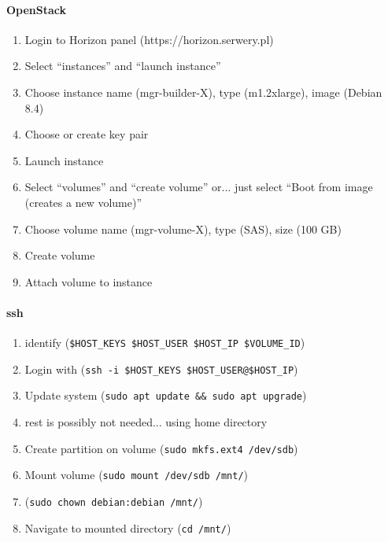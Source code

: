 \documentclass[printmode]{mgr}
\begin{document}






\paragraph{OpenStack}



\begin{enumerate}
  \item Login to Horizon panel (https://horizon.serwery.pl)
  \item Select ``instances'' and ``launch instance''
  \item Choose instance name (mgr-builder-X), type (m1.2xlarge), image (Debian 8.4)
  \item Choose or create key pair
  \item Launch instance
  \item Select ``volumes'' and ``create volume'' or... just select ``Boot from image (creates a new volume)'' 
  \item Choose volume name (mgr-volume-X), type (SAS), size (100 GB)
  \item Create volume
  \item Attach volume to instance
\end{enumerate}

\paragraph{ssh}

\begin{enumerate}
  \item identify (\verb|$HOST_KEYS $HOST_USER $HOST_IP $VOLUME_ID|)
  \item Login with (\verb|ssh -i $HOST_KEYS $HOST_USER@$HOST_IP|)
  \item Update system (\verb|sudo apt update && sudo apt upgrade|)
  \item rest is possibly not needed... using home directory
  \item Create partition on volume (\verb|sudo mkfs.ext4 /dev/sdb|)
  \item Mount volume (\verb|sudo mount /dev/sdb /mnt/|)
  \item (\verb|sudo chown debian:debian /mnt/|)
  \item Navigate to mounted directory (\verb|cd /mnt/|)
\end{enumerate}
\end{document}
